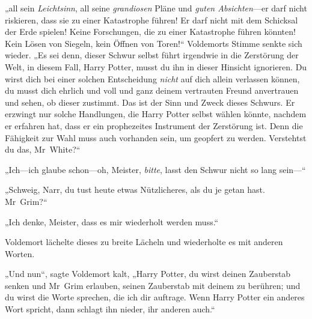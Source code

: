 „all sein \emph{Leichtsinn}, all seine \emph{grandiosen} Pläne und \emph{guten Absichten}—er darf nicht riskieren, dass sie zu einer Katastrophe führen! Er darf nicht mit dem Schicksal der Erde spielen! Keine Forschungen, die zu einer Katastrophe führen könnten! Kein Lösen von Siegeln, kein Öffnen von Toren!“
Voldemorts Stimme senkte sich wieder.
„Es sei denn, dieser Schwur selbst führt irgendwie in die Zerstörung der Welt, in diesem Fall, Harry Potter, musst du ihn in dieser Hinsicht ignorieren. Du wirst dich bei einer solchen Entscheidung \emph{nicht} auf dich allein verlassen können, du musst dich ehrlich und voll und ganz deinem vertrauten Freund anvertrauen und sehen, ob dieser zustimmt. Das ist der Sinn und Zweck dieses Schwurs. Er erzwingt nur solche Handlungen, die Harry Potter selbst wählen könnte, nachdem er erfahren hat, dass er ein prophezeites Instrument der Zerstörung ist. Denn die Fähigkeit zur Wahl muss auch vorhanden sein, um geopfert zu werden. Verstehtst du das, Mr~White?“

„Ich—ich glaube schon—oh, Meister, \emph{bitte}, lasst den Schwur nicht so lang sein—“

„Schweig, Narr, du tust heute etwas Nützlicheres, als du je getan hast. Mr~Grim?“

„Ich denke, Meister, dass es mir wiederholt werden muss.“

Voldemort lächelte dieses zu breite Lächeln und wiederholte es mit anderen Worten.

„Und nun“, sagte Voldemort kalt, „Harry Potter, du wirst deinen Zauberstab senken und Mr~Grim erlauben, seinen Zauberstab mit deinem zu berühren; und du wirst die Worte sprechen, die ich dir auftrage. Wenn Harry Potter ein anderes Wort spricht, dann schlagt ihn nieder, ihr anderen auch.“

